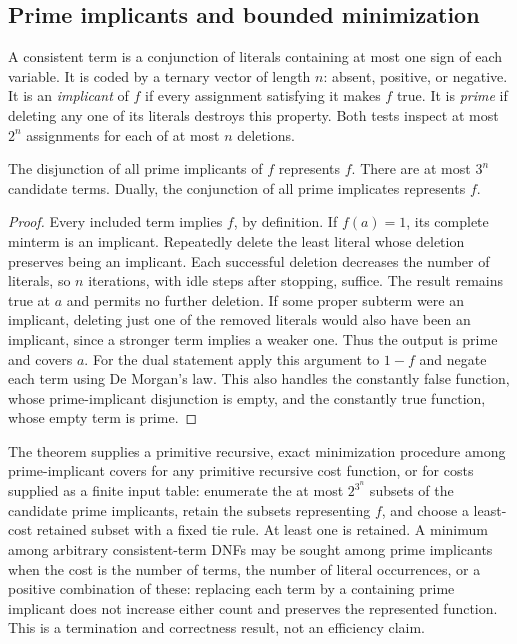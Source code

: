 \subsection{Prime implicants and bounded minimization}

A consistent term is a conjunction of literals containing at most one sign
of each variable.  It is coded by a ternary vector of length $n$: absent,
positive, or negative.  It is an \emph{implicant} of $f$ if every assignment
satisfying it makes $f$ true.  It is \emph{prime} if deleting any one of its
literals destroys this property.  Both tests inspect at most $2^n$
assignments for each of at most $n$ deletions.

\begin{theorem}\label{ca-prime}
The disjunction of all prime implicants of $f$ represents $f$.  There are
at most $3^n$ candidate terms.  Dually, the conjunction of all prime implicates
represents $f$.
\end{theorem}
\begin{proof}
Every included term implies $f$, by definition.  If $f(a)=1$, its complete
minterm is an implicant.  Repeatedly delete the least literal whose deletion
preserves being an implicant.  Each successful deletion decreases the number
of literals, so $n$ iterations, with idle steps after stopping, suffice.
The result remains true at $a$ and permits no further deletion.  If some
proper subterm were an implicant, deleting just one of the removed literals
would also have been an implicant, since a stronger term implies a weaker
one.  Thus the output is prime and covers $a$.  For the dual statement apply
this argument to $1-f$ and negate each term using De Morgan's law.  This also
handles the constantly false function, whose prime-implicant disjunction is
empty, and the constantly true function, whose empty term is prime.
\end{proof}

The theorem supplies a primitive recursive, exact minimization procedure
among prime-implicant covers for any primitive recursive cost function, or
for costs supplied as a finite input table: enumerate the at most
$2^{3^n}$ subsets of the candidate prime implicants, retain the subsets
representing $f$, and choose a least-cost retained subset with a fixed tie
rule.  At least one is retained.  A minimum among arbitrary
consistent-term DNFs may be sought among prime implicants when the cost is
the number of terms, the number of literal occurrences, or a positive
combination of these: replacing each term by a containing prime implicant
does not increase either count and preserves the represented function.
This is a termination and correctness result, not an efficiency claim.

